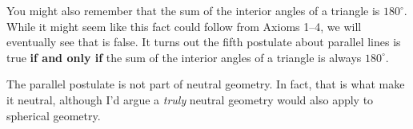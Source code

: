 \documentclass[noauthor,nooutcomes,12pt,hints]{ximera}
\begin{document}
You might also remember that the sum of the interior angles of a
triangle is $180^\circ$. While it might seem like this fact could
follow from Axioms 1--4, we will eventually see that is false. It turns
out the fifth postulate about parallel lines is true {\bf if and only
  if} the sum of the interior angles of a triangle is always
$180^\circ$.%

\begin{remark}
  The parallel postulate is not part of neutral geometry. In fact,
  that is what make it neutral, although I'd argue a \emph{truly}
  neutral geometry would also apply to spherical geometry.
\end{remark}
\end{document}
